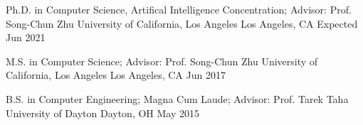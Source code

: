 


\begin{cventries}


\cventry
{Ph.D. in Computer Science, Artifical Intelligence Concentration; Advisor: Prof. Song-Chun Zhu}
{University of California, Los Angeles} %
{Los Angeles, CA} %
{Expected Jun 2021} %
{ %
}


\cventry
{M.S. in Computer Science; Advisor: Prof. Song-Chun Zhu}
{University of California, Los Angeles} %
{Los Angeles, CA} %
{Jun 2017} %
{ %
}


\cventry
{B.S. in Computer Engineering; Magna Cum Laude; Advisor: Prof. Tarek Taha}
{University of Dayton} %
{Dayton, OH} %
{May 2015} %
{ %
}


\end{cventries}